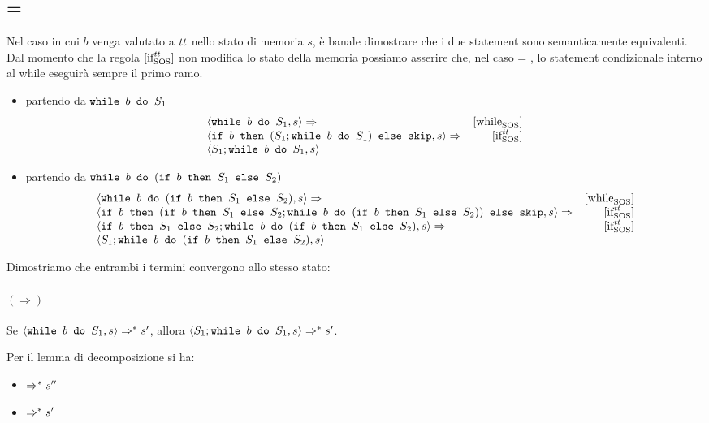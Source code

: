 \subsection{ = \semtrue}

Nel caso in cui $b$ venga valutato a $\semtrue$ nello stato di memoria $s$, è
banale dimostrare che i due statement sono semanticamente equivalenti. Dal 
momento che la regola $\ifttSOS{}$ non modifica lo stato della memoria
possiamo asserire che, nel caso  = \semtrue, lo 
statement condizionale interno al while eseguirà sempre il primo ramo.

\begin{itemize}
  \item partendo da $\wbS{b}{S_1}$
  $$
\begin{array}{lr}
\confSs{\wbS{b}{S_1}}{s} \Rar{} &
\whileSOS \\
\confSs{\ifABC{b}{(S_1;\wbS{b}{S_1})}{\skipForFriends}}{s} \Rar{} &
\ifttSOS \\
\confSs{S_1;\wbS{b}{S_1}}{s} &
\end{array}
  $$
  \item partendo da $\wbS{b}{(\ifABC{b}{S_1}{S_2})}$
  $$
\begin{array}{lr}
\confSs{\wbS{b}{(\ifABC{b}{S_1}{S_2})}}{s} \Rar{} &
\whileSOS \\
\confSs{\ifABC{b}
              {(\ifABC{b}{S_1}{S_2}; \wbS{b}{(\ifABC{b}{S_1}{S_2})})}
              {\skipForFriends}}
       {s} \Rar{} &
\ifttSOS \\
\confSs{\ifABC{b}{S_1}{S_2}; \wbS{b}{(\ifABC{b}{S_1}{S_2})}}
       {s} \Rar{} &
\ifttSOS \\
\confSs{S_1; \wbS{b}{(\ifABC{b}{S_1}{S_2})}}{s}
\end{array}
  $$
\end{itemize}

Dimostriamo che entrambi i termini convergono allo stesso
stato:

\paragraph{$(\Rightarrow)$}

Se $\confSs{\wbS{b}{S_1}}{s} \Rar{*} s'$, allora
$\confSs{S_1;\wbS{b}{S_1}}{s} \Rar{*} s'$.

Per il lemma di decomposizione si ha:
\begin{itemize}
  \item {} $\Rar{*} s''$
  \item {} $\Rar{*} s'$
\end{itemize}

